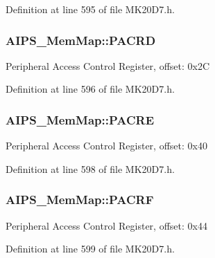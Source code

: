 Definition at line 595 of file M\+K20\+D7.\+h.

\subsubsection[{\texorpdfstring{P\+A\+C\+RD}{PACRD}}]{ A\+I\+P\+S\+\_\+\+Mem\+Map\+::\+P\+A\+C\+RD}\hypertarget{struct_a_i_p_s___mem_map_a98bd3ff2455e9fccb9cd7d06cc090370}{}\label{struct_a_i_p_s___mem_map_a98bd3ff2455e9fccb9cd7d06cc090370}
Peripheral Access Control Register, offset\+: 0x2C 

Definition at line 596 of file M\+K20\+D7.\+h.

\subsubsection[{\texorpdfstring{P\+A\+C\+RE}{PACRE}}]{ A\+I\+P\+S\+\_\+\+Mem\+Map\+::\+P\+A\+C\+RE}\hypertarget{struct_a_i_p_s___mem_map_ad1f2d4b98aea7609a045558a9dc20f7b}{}\label{struct_a_i_p_s___mem_map_ad1f2d4b98aea7609a045558a9dc20f7b}
Peripheral Access Control Register, offset\+: 0x40 

Definition at line 598 of file M\+K20\+D7.\+h.

\subsubsection[{\texorpdfstring{P\+A\+C\+RF}{PACRF}}]{ A\+I\+P\+S\+\_\+\+Mem\+Map\+::\+P\+A\+C\+RF}\hypertarget{struct_a_i_p_s___mem_map_aedfe0bcf944c983903be902a97a1f59a}{}\label{struct_a_i_p_s___mem_map_aedfe0bcf944c983903be902a97a1f59a}
Peripheral Access Control Register, offset\+: 0x44 

Definition at line 599 of file M\+K20\+D7.\+h.

